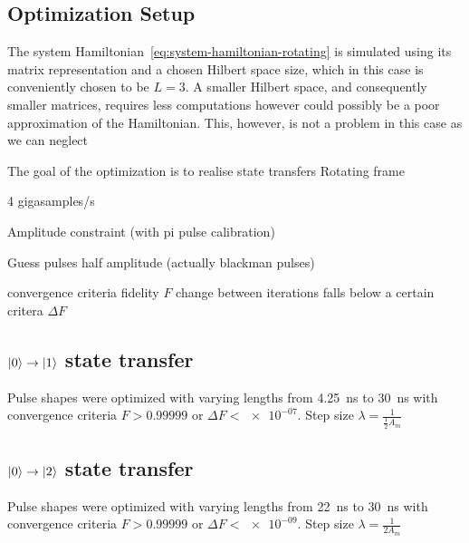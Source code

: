 \documentclass[main.tex]{subfiles}
\begin{document}
\subsection{Optimization Setup}
The system Hamiltonian~\eqref{eq:system-hamiltonian-rotating} is simulated using its matrix representation and a chosen Hilbert space size, which in this case is conveniently chosen to be \( L = 3 \).
A smaller Hilbert space, and consequently smaller matrices, requires less computations however could possibly be a poor approximation of the Hamiltonian.
This, however, is not a problem in this case as we can neglect %

The goal of the optimization is to realise state transfers
Rotating frame

4 gigasamples/s

Amplitude constraint (with pi pulse calibration)

Guess pulses half amplitude (actually blackman pulses)

convergence criteria
fidelity \(F\)
change between iterations falls below a certain critera \(\Delta F\)

\subsection{\texorpdfstring{\boldmath\(\ket{0}\rightarrow\ket{1}\)}{0 -> 1} state transfer}
Pulse shapes were optimized with varying lengths from \SI{4.25}{\nano\second} to \SI{30}{\nano\second} with convergence criteria \(F>0.99999\) or \(\Delta F < \num{e-07}\). Step size \(\lambda = \frac{1}{\frac{1}{2}A_{m}}\)

\subsection{\texorpdfstring{\boldmath\(\ket{0}\rightarrow\ket{2}\)}{0 -> 2} state transfer}
Pulse shapes were optimized with varying lengths from \SI{22}{\nano\second} to \SI{30}{\nano\second} with convergence criteria \(F>0.99999\) or \(\Delta F < \num{e-09}\). Step size \(\lambda = \frac{1}{2A_{m}}\)
\end{document}
